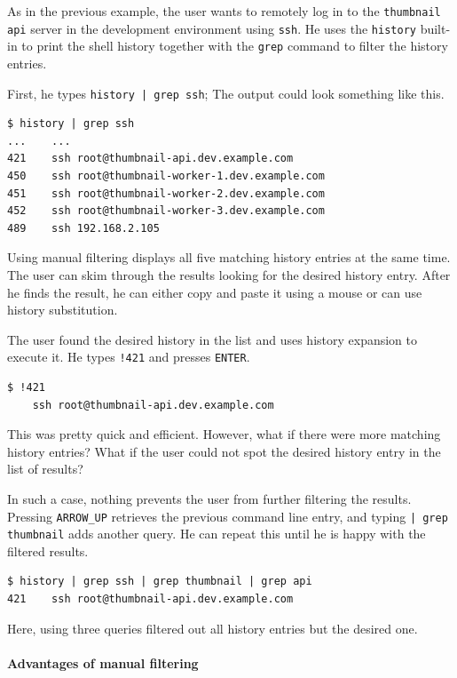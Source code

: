 As in the previous example, the user wants to remotely log in to the \verb|thumbnail| \verb|api| server in the development environment using \verb|ssh|. He uses the \verb|history| built-in to print the shell history together with the \verb|grep| command to filter the history entries.

First, he types \verb#history | grep ssh#; The output could look something like this.

\begin{verbatim}
$ history | grep ssh
...    ...
421    ssh root@thumbnail-api.dev.example.com
450    ssh root@thumbnail-worker-1.dev.example.com
451    ssh root@thumbnail-worker-2.dev.example.com
452    ssh root@thumbnail-worker-3.dev.example.com
489    ssh 192.168.2.105
\end{verbatim}


Using manual filtering displays all five matching history entries at the same time. The user can skim through the results looking for the desired history entry. 
After he finds the result, he can either copy and paste it using a mouse or can use history substitution.

The user found the desired history in the list and uses history expansion to execute it. He types \verb|!421| and presses \verb|ENTER|.

\begin{verbatim}
$ !421
    ssh root@thumbnail-api.dev.example.com
\end{verbatim}

This was pretty quick and efficient. However, what if there were more matching history entries? What if the user could not spot the desired history entry in the list of results?

In such a case, nothing prevents the user from further filtering the results. Pressing \verb|ARROW_UP| retrieves the previous command line entry, and typing \verb#| grep thumbnail# adds another query. He can repeat this until he is happy with the filtered results.

\begin{verbatim}
$ history | grep ssh | grep thumbnail | grep api
421    ssh root@thumbnail-api.dev.example.com
\end{verbatim}

Here, using three queries filtered out all history entries but the desired one.

\paragraph{Advantages of manual filtering}


